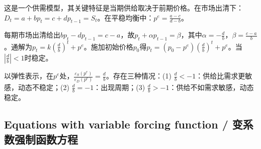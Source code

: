 \begin{translation}
这是一个供需模型，其关键特征是当期供给取决于前期价格。在市场出清下：$D_t = a + b p_t = c + d p_{t-1} = S_t$。在平稳均衡中：$p^e = \frac{a-c}{d-b}$。

每期市场出清给出$b p_t - d p_{t-1} = c - a$，故$p_t + \alpha p_{t-1} = \beta$，其中$\alpha = -\frac{d}{b}$，$\beta = \frac{c-a}{b}$。通解为$p_t = k(\frac{d}{b})^t + p^e$。施加初始价格$p_0$得$p_t = (p_0 - p^e)(\frac{d}{b})^t + p^e$。当$|\frac{d}{b}| < 1$时稳定。

以弹性表示，在$p^e$处，$\frac{\varepsilon_S(p^e)}{\varepsilon_D(p^e)} = \frac{d}{b}$。存在三种情况：(1) $\frac{d}{b} < -1$：供给比需求更敏感，动态不稳定；(2) $\frac{d}{b} = -1$：出现周期；(3) $\frac{d}{b} > -1$：供给不如需求敏感，动态稳定。
\end{translation}

\subsection{Equations with variable forcing function / 变系数强制函数方程}


